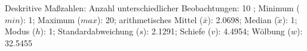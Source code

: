 				\label{tableValues:bfvt062b}
				\vspace*{-\baselineskip}
                    \begin{noten}
                	    \note{} Deskritive Maßzahlen:
                	    Anzahl unterschiedlicher Beobachtungen: 10%
                	    ; 
                	      Minimum ($min$): 1; 
                	      Maximum ($max$): 20; 
                	      arithmetisches Mittel ($\bar{x}$): \num[round-mode=places,round-precision=2]{2,0698}; 
                	      Median ($\tilde{x}$): 1; 
                	      Modus ($h$): 1; 
                	      Standardabweichung ($s$): \num[round-mode=places,round-precision=2]{2,1291}; 
                	      Schiefe ($v$): \num[round-mode=places,round-precision=2]{4,4954}; 
                	      Wölbung ($w$): \num[round-mode=places,round-precision=2]{32,5455}
                     \end{noten}


